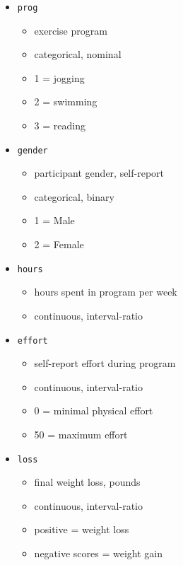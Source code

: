 \documentclass[
]{article}
\providecommand{\tightlist}{%
  \setlength{\itemsep}{0pt}\setlength{\parskip}{0pt}}
\begin{document}
\begin{itemize}
\tightlist
\item
  \texttt{prog}

  \begin{itemize}
  \tightlist
  \item
    exercise program
  \item
    categorical, nominal
  \item
    1 = jogging
  \item
    2 = swimming
  \item
    3 = reading
  \end{itemize}
\item
  \texttt{gender}

  \begin{itemize}
  \tightlist
  \item
    participant gender, self-report
  \item
    categorical, binary
  \item
    1 = Male
  \item
    2 = Female
  \end{itemize}
\item
  \texttt{hours}

  \begin{itemize}
  \tightlist
  \item
    hours spent in program per week
  \item
    continuous, interval-ratio
  \end{itemize}
\item
  \texttt{effort}

  \begin{itemize}
  \tightlist
  \item
    self-report effort during program
  \item
    continuous, interval-ratio
  \item
    0 = minimal physical effort
  \item
    50 = maximum effort
  \end{itemize}
\item
  \texttt{loss}

  \begin{itemize}
  \tightlist
  \item
    final weight loss, pounds
  \item
    continuous, interval-ratio
  \item
    positive = weight loss
  \item
    negative scores = weight gain
  \end{itemize}
\end{itemize}
\end{document}
